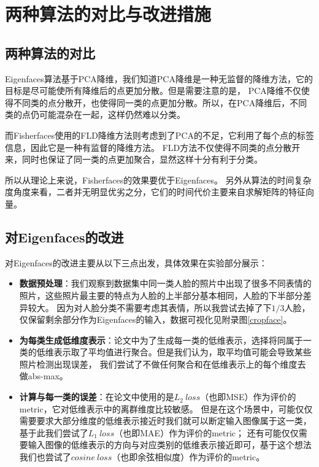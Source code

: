 \documentclass{ctexart}
\begin{document}
\section{两种算法的对比与改进措施}
\subsection{两种算法的对比}
Eigenfaces算法基于PCA降维，我们知道PCA降维是一种无监督的降维方法，它的目标是尽可能使所有降维后的点更加分散。但是需要注意的是，
PCA降维不仅使得不同类的点分散开，也使得同一类的点更加分散。所以，在PCA降维后，不同类的点仍可能混杂在一起，这样仍然难以分类。

而Fisherfaces使用的FLD降维方法则考虑到了PCA的不足，它利用了每个点的标签信息，因此它是一种有监督的降维方法。
FLD方法不仅使得不同类的点分散开来，同时也保证了同一类的点更加聚合，显然这样十分有利于分类。

所以从理论上来说，Fisherfaces的效果要优于Eigenfaces。
另外从算法的时间复杂度角度来看，二者并无明显优劣之分，它们的时间代价主要来自求解矩阵的特征向量。

\subsection{对Eigenfaces的改进}
\noindent
对Eigenfaces的改进主要从以下三点出发，具体效果在实验部分展示：
\begin{itemize}
    \item \textbf{数据预处理}：我们观察到数据集中同一类人脸的照片中出现了很多不同表情的照片，这些照片最主要的特点为人脸的上半部分基本相同，人脸的下半部分差异较大。
          因为对人脸分类不需要考虑其表情，所以我尝试去掉了下$1/3$人脸，仅保留剩余部分作为Eigenfaces的输入，数据可视化见附录图\ref{cropface}。
    \item \textbf{为每类生成低维度表示}：论文中为了生成每一类的低维表示，选择将同属于一类的低维表示取了平均值进行聚合。但是我们认为，取平均值可能会导致某些照片检测出现误差，
          我们尝试了不做任何聚合和在低维表示上的每个维度去做abs-max。
    \item \textbf{计算与每一类的误差}：在论文中使用的是$L_2\ loss$（也即MSE）作为评价的metric，它对低维表示中的离群维度比较敏感。
          但是在这个场景中，可能仅仅需要要求大部分维度的低维表示接近时我们就可以断定输入图像属于这一类，基于此我们尝试了$L_1\ loss$（也即MAE）作为评价的metric；
          还有可能仅仅需要输入图像的低维表示的方向与对应类别的低维表示接近即可，基于这个想法我们也尝试了$cosine\ loss$（也即余弦相似度）作为评价的metric。
\end{itemize}
\end{document}
